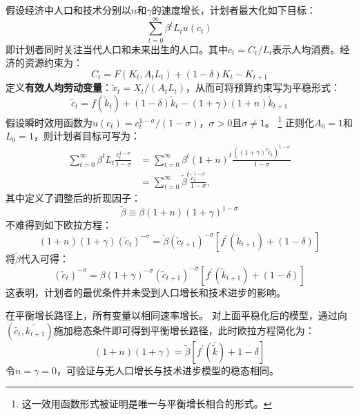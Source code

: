 假设经济中人口和技术分别以$n$和$\gamma$的速度增长，计划者最大化如下目标：
\begin{equation*}
    \sum_{t=0}^{\infty} \beta^t L_t u\left(c_t\right)
\end{equation*}
即计划者同时关注当代人口和未来出生的人口。其中$c_t = C_t/L_t$表示人均消费。经济的资源约束为：
\begin{equation*}
    C_t = F(K_t, A_tL_t) + (1-\delta)K_t - K_{t+1}
\end{equation*}
定义\textbf{有效人均劳动变量}：$\tilde{x}_t = X_t / (A_tL_t)$，从而可将预算约束写为平稳形式：
\begin{equation}
    \tilde{c}_t=f\left(\tilde{k}_t\right)+(1-\delta) \tilde{k}_t-(1+\gamma)(1+n) \tilde{k}_{t+1}
\end{equation}
假设瞬时效用函数为$u(c_t) = c_t^{1-\sigma}/(1-\sigma)$，$\sigma>0$且$\sigma \neq 1$。
\footnote{这一效用函数形式被证明是唯一与平衡增长相合的形式。}
正则化$A_0=1$和$L_0=1$，则计划者目标可写为：
\begin{equation}
    \begin{aligned}
    \sum_{t=0}^{\infty} \beta^t L_t \frac{c_t^{1-\sigma}}{1-\sigma} &=
        \sum_{t=0}^{\infty} \beta^t(1+n)^t \frac{\left((1+\gamma)^t \tilde{c}_t\right)^{1-\sigma}}{1-\sigma} \\
    & =\sum_{t=0}^{\infty} \tilde{\beta}^t \frac{\tilde{c}_t^{1-\sigma}}{1-\sigma},
    \end{aligned}
\end{equation}
其中定义了调整后的折现因子：
\begin{equation}
    \tilde{\beta} \equiv \beta(1+n)(1+\gamma)^{1-\sigma}
\end{equation}
不难得到如下欧拉方程：
\begin{equation*}
    (1+n)(1+\gamma)\left(\tilde{c}_t\right)^{-\sigma} = 
    \tilde{\beta}\left(\tilde{c}_{t+1}\right)^{-\sigma}\left[f^{\prime}\left(\tilde{k}_{t+1}\right)+(1-\delta)\right]
\end{equation*}
将$\tilde{\beta}$代入可得：
\begin{equation*}
    \left(\tilde{c}_t\right)^{-\sigma} = \beta \left(1+\gamma\right)^{-\sigma}
        \left(\tilde{c}_{t+1}\right)^{-\sigma}\left[f^{\prime}\left(\tilde{k}_{t+1}\right)+(1-\delta)\right]
\end{equation*}
这表明，计划者的最优条件并未受到人口增长和技术进步的影响。

在平衡增长路径上，所有变量以相同速率增长。
对上面平稳化后的模型，通过向$(\tilde{c_t},\tilde{k_{t+1}})$施加稳态条件即可得到平衡增长路径，此时欧拉方程简化为：
\begin{equation*}
    (1+n)(1+\gamma) = \tilde{\beta}\left[f^{\prime}(\bar{\tilde{k}})+1-\delta\right]
\end{equation*}
令$n=\gamma=0$，可验证与无人口增长与技术进步模型的稳态相同。
